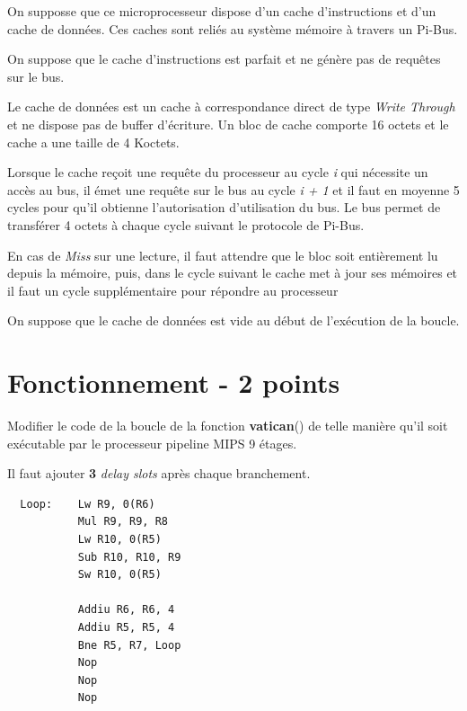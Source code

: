 On supposse que ce microprocesseur dispose d'un cache d'instructions et d'un
cache de donn\'ees. Ces caches sont reli\'es au syst\`eme m\'emoire \`a
travers un Pi-Bus.

On suppose que le cache d'instructions est parfait et ne g\'en\`ere pas de
requ\^etes sur le bus.

Le cache de donn\'ees est un cache \`a correspondance direct de type
\textit{Write Through} et ne dispose pas de buffer d'\'ecriture. Un bloc
de cache comporte 16 octets et le cache a une taille de 4 Koctets.

Lorsque le cache re\c{c}oit une requ\^ete du processeur au cycle \textit{i}
qui n\'ecessite un acc\`es au bus, il \'emet une requ\^ete sur le bus au
cycle \textit{i + 1} et il faut en moyenne 5 cycles pour qu'il obtienne
l'autorisation d'utilisation du bus. Le bus permet de transf\'erer 4 octets
\`a chaque cycle suivant le protocole de Pi-Bus.

En cas de \textit{Miss} sur une lecture, il faut attendre que le bloc soit
enti\`erement lu depuis la m\'emoire, puis, dans le cycle suivant le cache
met \`a jour ses m\'emoires et il faut un cycle suppl\'ementaire pour
r\'epondre au processeur

On suppose que le cache de donn\'ees est vide au d\'ebut de l'ex\'ecution
de la boucle.

%
%

\section{Fonctionnement - 2 points}

Modifier le code de la boucle de la fonction \textbf{vatican}() de telle
mani\`ere qu'il soit ex\'ecutable par le processeur pipeline MIPS 9 \'etages.

\begin{correction}

  Il faut ajouter \textbf{3} \textit{delay slots} apr\`es chaque
  branchement.

  \begin{verbatim}
  Loop:    Lw R9, 0(R6)
           Mul R9, R9, R8
           Lw R10, 0(R5)
           Sub R10, R10, R9
           Sw R10, 0(R5)

           Addiu R6, R6, 4
           Addiu R5, R5, 4
           Bne R5, R7, Loop
           Nop
           Nop
           Nop
  \end{verbatim}

\end{correction}

